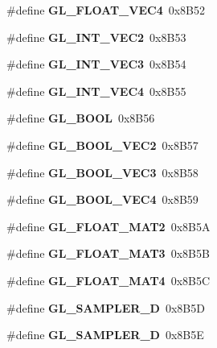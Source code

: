 \begin{DoxyCompactItemize}
\item 
\#define {\bfseries G\+L\+\_\+\+F\+L\+O\+A\+T\+\_\+\+V\+E\+C4}~0x8\+B52\label{_s_d_l__opengl_8h_a696cfaceb3256bf19e990e46702fe527}

\item 
\#define {\bfseries G\+L\+\_\+\+I\+N\+T\+\_\+\+V\+E\+C2}~0x8\+B53\label{_s_d_l__opengl_8h_a2e72a47b144427174af2d6d87a7ab073}

\item 
\#define {\bfseries G\+L\+\_\+\+I\+N\+T\+\_\+\+V\+E\+C3}~0x8\+B54\label{_s_d_l__opengl_8h_a08b6c6a8259ac4ad9ad5d8e7c3d13bb1}

\item 
\#define {\bfseries G\+L\+\_\+\+I\+N\+T\+\_\+\+V\+E\+C4}~0x8\+B55\label{_s_d_l__opengl_8h_ae3fd6dab6e2260ce7fa4cdccbcfba0fb}

\item 
\#define {\bfseries G\+L\+\_\+\+B\+O\+O\+L}~0x8\+B56\label{_s_d_l__opengl_8h_a43c7205c5f4dc7a535bd32817766e272}

\item 
\#define {\bfseries G\+L\+\_\+\+B\+O\+O\+L\+\_\+\+V\+E\+C2}~0x8\+B57\label{_s_d_l__opengl_8h_a40a09ccdfe230775cf871b10f4361183}

\item 
\#define {\bfseries G\+L\+\_\+\+B\+O\+O\+L\+\_\+\+V\+E\+C3}~0x8\+B58\label{_s_d_l__opengl_8h_a0c51fbe743a6c9da5d2f7ac4306b66df}

\item 
\#define {\bfseries G\+L\+\_\+\+B\+O\+O\+L\+\_\+\+V\+E\+C4}~0x8\+B59\label{_s_d_l__opengl_8h_a1985184535af747c30a8a12481e2ffd9}

\item 
\#define {\bfseries G\+L\+\_\+\+F\+L\+O\+A\+T\+\_\+\+M\+A\+T2}~0x8\+B5\+A\label{_s_d_l__opengl_8h_ab66c332d55f70b7fe36640d49235a7d7}

\item 
\#define {\bfseries G\+L\+\_\+\+F\+L\+O\+A\+T\+\_\+\+M\+A\+T3}~0x8\+B5\+B\label{_s_d_l__opengl_8h_a61fcf58656eb22c75d2353e091458e0f}

\item 
\#define {\bfseries G\+L\+\_\+\+F\+L\+O\+A\+T\+\_\+\+M\+A\+T4}~0x8\+B5\+C\label{_s_d_l__opengl_8h_af2f9eda8aec4c169cf1800b61ead61fb}

\item 
\#define {\bfseries G\+L\+\_\+\+S\+A\+M\+P\+L\+E\+R\+\_\+D}~0x8\+B5\+D\label{_s_d_l__opengl_8h_a2d29ae66c897d44f3da8b8384a097d04}

\item 
\#define {\bfseries G\+L\+\_\+\+S\+A\+M\+P\+L\+E\+R\+\_\+D}~0x8\+B5\+E\label{_s_d_l__opengl_8h_a166645e482b60d35b1d31c2f6f378238}


\end{DoxyCompactItemize}
